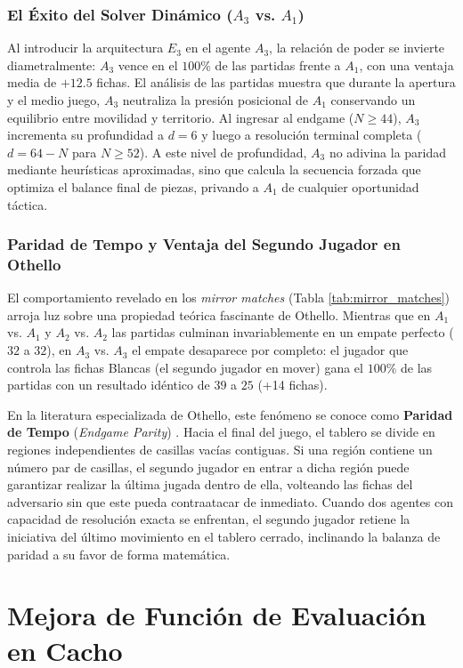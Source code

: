 \documentclass[10pt,a4paper]{article}
\begin{document}
\subsubsection{El Éxito del Solver Dinámico \texorpdfstring{($A_3$ vs. $A_1$)}{(A3 vs. A1)}}
Al introducir la arquitectura $E_3$ en el agente $A_3$, la relación de poder se invierte diametralmente: $A_3$ vence en el $100\%$ de las partidas frente a $A_1$, con una ventaja media de $+12.5$ fichas. El análisis de las partidas muestra que durante la apertura y el medio juego, $A_3$ neutraliza la presión posicional de $A_1$ conservando un equilibrio entre movilidad y territorio. Al ingresar al endgame ($N \ge 44$), $A_3$ incrementa su profundidad a $d=6$ y luego a resolución terminal completa ($d = 64-N$ para $N \ge 52$). A este nivel de profundidad, $A_3$ no adivina la paridad mediante heurísticas aproximadas, sino que calcula la secuencia forzada que optimiza el balance final de piezas, privando a $A_1$ de cualquier oportunidad táctica.

\subsubsection{Paridad de Tempo y Ventaja del Segundo Jugador en Othello}
El comportamiento revelado en los \textit{mirror matches} (Tabla \ref{tab:mirror_matches}) arroja luz sobre una propiedad teórica fascinante de Othello. Mientras que en $A_1$ vs. $A_1$ y $A_2$ vs. $A_2$ las partidas culminan invariablemente en un empate perfecto ($32$ a $32$), en $A_3$ vs. $A_3$ el empate desaparece por completo: el jugador que controla las fichas Blancas (el segundo jugador en mover) gana el $100\%$ de las partidas con un resultado idéntico de $39$ a $25$ (+14 fichas).

En la literatura especializada de Othello, este fenómeno se conoce como \textbf{Paridad de Tempo} (\textit{Endgame Parity}) \cite{buro1997logistello}. Hacia el final del juego, el tablero se divide en regiones independientes de casillas vacías contiguas. Si una región contiene un número par de casillas, el segundo jugador en entrar a dicha región puede garantizar realizar la última jugada dentro de ella, volteando las fichas del adversario sin que este pueda contraatacar de inmediato. Cuando dos agentes con capacidad de resolución exacta se enfrentan, el segundo jugador retiene la iniciativa del último movimiento en el tablero cerrado, inclinando la balanza de paridad a su favor de forma matemática.

\section{Mejora de Función de Evaluación en Cacho}
\end{document}
